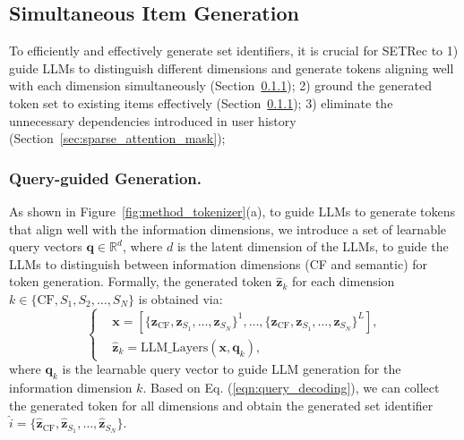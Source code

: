 \subsection{Simultaneous Item Generation} 
To efficiently and effectively generate set identifiers, it is crucial for SETRec to 
1) guide LLMs to distinguish different dimensions and generate tokens aligning well with each dimension simultaneously (Section~\ref{sec:query-based_decoding}); 
2) ground the generated token set to existing items effectively (Section~\ref{sec:query-based_decoding}); 
3) eliminate the unnecessary dependencies introduced in user history (Section~\ref{sec:sparse_attention_mask}); 

\subsubsection{\textbf{Query-guided Generation}.}\label{sec:query-based_decoding}
As shown in Figure~\ref{fig:method_tokenizer}(a), to guide LLMs to generate tokens that align well with the information dimensions, 
we introduce a set of learnable query vectors $\bm{q}\in\mathbb{R}^{d}$, where $d$ is the latent dimension of the LLMs, to guide the LLMs to distinguish between information dimensions (\eg CF and semantic) for token generation. 
Formally, the generated token $\hat{\bm{z}}_k$ for each dimension $k\in\{\text{CF}, S_1, S_2, \dots, S_N\}$ is obtained via:
\begin{equation}\label{eqn:query_decoding}
\left\{
\begin{aligned}
    &\bm{x} = [\{\bm{z}_{\text{CF}}, \bm{z}_{S_1}, 
     \dots, \bm{z}_{S_N}\}^{1}, \dots, \{\bm{z}_{\text{CF}}, \bm{z}_{S_1}, \dots,\bm{z}_{S_N}\}^{L}], \\
    &\hat{\bm{z}}_{k} = \text{LLM\_Layers}(\bm{x}, \bm{q}_k),
\end{aligned}
\right.
\end{equation}
where $\bm{q}_k$ is the learnable query vector to guide LLM generation for the information dimension $k$. 
Based on Eq. (\ref{eqn:query_decoding}), we can collect the generated token for all dimensions and obtain the generated set identifier  $\hat{i}=\{\hat{\bm{z}}_{\text{CF}}, \hat{\bm{z}}_{S_1}, \dots, 
\hat{\bm{z}}_{S_N}
\}$. 

